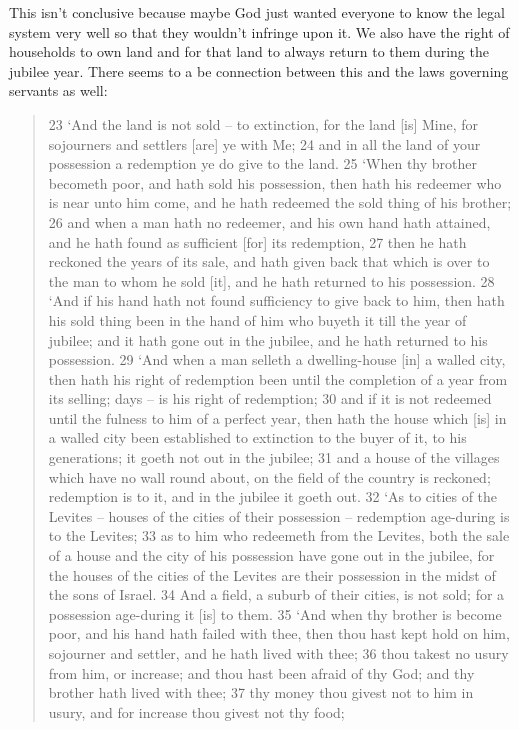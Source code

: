 \documentclass[11pt]{article}
\begin{document}
{This isn't conclusive because maybe God just wanted everyone to know the legal system very well so that they wouldn't infringe upon it. We also have the right of households to own land and for that land to always return to them during the jubilee year. There seems to a be connection between this and the laws governing servants as well:
\begin{quote}
23 `And the land is not sold -- to extinction, for the land [is] Mine, for sojourners and settlers [are] ye with Me;
24 and in all the land of your possession a redemption ye do give to the land.
25 `When thy brother becometh poor, and hath sold his possession, then hath his redeemer who is near unto him come, and he hath redeemed the sold thing of his brother;
26 and when a man hath no redeemer, and his own hand hath attained, and he hath found as sufficient [for] its redemption,
27 then he hath reckoned the years of its sale, and hath given back that which is over to the man to whom he sold [it], and he hath returned to his possession.
28 `And if his hand hath not found sufficiency to give back to him, then hath his sold thing been in the hand of him who buyeth it till the year of jubilee; and it hath gone out in the jubilee, and he hath returned to his possession.
29 `And when a man selleth a dwelling-house [in] a walled city, then hath his right of redemption been until the completion of a year from its selling; days -- is his right of redemption;
30 and if it is not redeemed until the fulness to him of a perfect year, then hath the house which [is] in a walled city been established to extinction to the buyer of it, to his generations; it goeth not out in the jubilee;
31 and a house of the villages which have no wall round about, on the field of the country is reckoned; redemption is to it, and in the jubilee it goeth out.
32 `As to cities of the Levites -- houses of the cities of their possession -- redemption age-during is to the Levites;
33 as to him who redeemeth from the Levites, both the sale of a house and the city of his possession have gone out in the jubilee, for the houses of the cities of the Levites are their possession in the midst of the sons of Israel.
34 And a field, a suburb of their cities, is not sold; for a possession age-during it [is] to them.
35 `And when thy brother is become poor, and his hand hath failed with thee, then thou hast kept hold on him, sojourner and settler, and he hath lived with thee;
36 thou takest no usury from him, or increase; and thou hast been afraid of thy God; and thy brother hath lived with thee;
37 thy money thou givest not to him in usury, and for increase thou givest not thy food;

\end{quote}}
\end{document}
